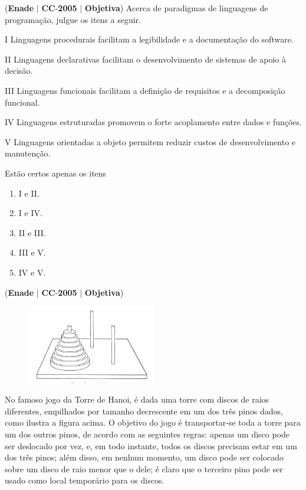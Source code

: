 \documentclass{exam}
\begin{document}
\begin{questions}
\question (\textbf{Enade} $|$ \textbf{CC}-\textbf{2005} $|$ \textbf{Objetiva})
Acerca de paradigmas de linguagens de programação, julgue
os itens a seguir.

I Linguagens procedurais facilitam a legibilidade e a
documentação do software.

II Linguagens declarativas facilitam o desenvolvimento de
sistemas de apoio à decisão.

III Linguagens funcionais facilitam a definição de requisitos
e a decomposição funcional.

IV Linguagens estruturadas promovem o forte acoplamento
entre dados e funções.

V Linguagens orientadas a objeto permitem reduzir custos de
desenvolvimento e manutenção.

Estão certos apenas os itens
	\begin{enumerate}[label=\alph*)]
		\item  I e II. 
		\item  I e IV. 
		\item  II e III.
		\item  III e V.
		\item  IV e V.
	\end{enumerate}

\question (\textbf{Enade} $|$ \textbf{CC}-\textbf{2005} $|$ \textbf{Objetiva})

\begin{figure}[H]
	\begin{center}
		\includegraphics[width=0.5\textwidth]{CIENCIA_DA_COMPUTACAO_Prova2005-utf8_figuras/fig-0018.jpg}
	\end{center}
\end{figure}
No famoso jogo da Torre de Hanoi, é dada uma torre
com discos de raios diferentes, empilhados por tamanho
decrescente em um dos três pinos dados, como ilustra a figura
acima. O objetivo do jogo é transportar-se toda a torre para
um dos outros pinos, de acordo com as seguintes regras:
apenas um disco pode ser deslocado por vez, e, em todo
instante, todos os discos precisam estar em um dos três pinos;
além disso, em nenhum momento, um disco pode ser colocado
sobre um disco de raio menor que o dele; é claro que o
terceiro pino pode ser usado como local temporário para os
discos.


\end{questions}
\end{document}
